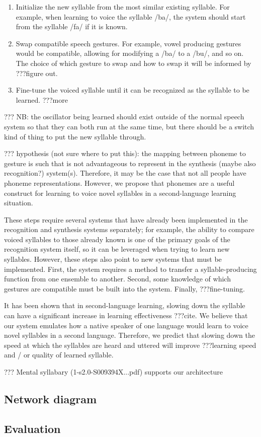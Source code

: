 \begin{enumerate}
\item Initialize the new syllable from the most
  similar existing syllable.
  For example, when learning to voice
  the syllable /ba/, the system should
  start from the syllable /fa/ if it is known.
\item Swap compatible speech gestures.
  For example, vowel producing gestures
  would be compatible, allowing for modifying
  a /ba/ to a /bu/, and so on.
  The choice of which gesture to swap and
  how to swap it will be informed by
  ???figure out.
\item Fine-tune the voiced syllable
  until it can be recognized as the
  syllable to be learned.
  ???more
\end{enumerate}

??? NB: the oscillator being learned should exist outside of
the normal speech system so that they can both run
at the same time, but there should be a switch kind of thing
to put the new syllable through.

??? hypothesis (not sure where to put this):
the mapping between phoneme to gesture
is such that is not advantageous
to represent in the synthesis
(maybe also recognition?) system(s).
Therefore, it may be the case that
not all people have phoneme representations.
However, we propose that phonemes
are a useful construct for learning to voice
novel syllables in a second-language learning situation.

These steps require several systems
that have already been implemented
in the recognition and synthesis systems separately;
for example, the ability to compare
voiced syllables to those already known
is one of the primary goals of the recognition system itself,
so it can be leveraged when trying to learn new syllables.
However, these steps also point to new systems
that must be implemented.
First, the system requires a method
to transfer a syllable-producing function
from one ensemble to another.
Second, some knowledge of which gestures
are compatible must be built into the system.
Finally, ???fine-tuning.

It has been shown that in second-language learning,
slowing down the syllable can have
a significant increase in learning effectiveness
???cite.
We believe that our system emulates
how a native speaker of one language
would learn to voice novel syllables in a second language.
Therefore, we predict that slowing down
the speed at which the syllables are heard
and uttered will improve ???learning speed
and / or quality of learned syllable.

??? Mental syllabary (1-s2.0-S009394X...pdf)
supports our architecture

\subsection{Network diagram}

\subsection{Evaluation}
